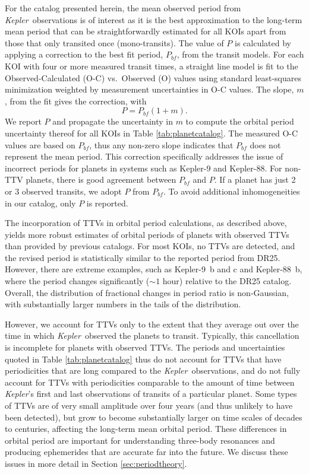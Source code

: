 \documentclass{aastex62}
\newcommand{\ikt}{{\it Kepler}}
\newcommand{\ik}{{\it Kepler~}}
\begin{document}
For the catalog presented herein, the mean observed period from \ik observations is of interest as it is the best approximation to the long-term mean period that can be straightforwardly estimated for all KOIs apart from those that only transited once (mono-transits). The value of $P$ is calculated by applying a correction to the best fit period, $P_{bf}$, from the transit models. For each KOI with four or more measured transit times, a straight line model is fit to the Observed-Calculated (O-C) vs.~Observed (O) values using standard least-squares minimization weighted by measurement uncertainties in O-C values.  The slope, $m$, from the fit gives the correction, with
\begin{equation}
P = P_{bf} (1 + m).
\end{equation}
We report $P$ and propagate the uncertainty in $m$ to compute the orbital period uncertainty thereof for all KOIs in Table \ref{tab:planetcatalog}.  The measured O-C values are based on $P_{bf}$, thus any non-zero slope indicates that $P_{bf}$ does not represent the mean period.  This correction specifically addresses the issue of incorrect periods for planets in systems such as Kepler-9 and Kepler-88.  For non-TTV planets, there is good agreement between $P_{bf}$ and $P$.  {If a planet has just 2 or 3 observed transits, we adopt $P$ from $P_{bf}$.}  To avoid additional inhomogeneities in our catalog, only $P$ is reported.

The incorporation of TTVs in orbital period calculations, as described above, yields {more robust estimates of orbital periods of planets with observed TTVs than provided by previous catalogs.  For most KOIs, no  TTVs  are detected, and the revised period is statistically similar to the reported period from DR25.  However, there are extreme examples, such as Kepler-9~b and c and Kepler-88~b, where the period changes significantly ($\sim 1$ hour) relative to the DR25 catalog.  Overall, the distribution of fractional changes in period ratio is non-Gaussian, with substantially larger numbers in the tails of the distribution. }  

However, we account for TTVs only to the extent that they average out over the time in which \ik observed the planets to transit.  Typically, this cancellation is incomplete for planets with observed TTVs. The periods and uncertainties quoted in Table \ref{tab:planetcatalog} thus do not account for TTVs that have periodicities that are long compared to the \ik observations, and do not fully account for TTVs with periodicities comparable to the amount of time between \ikt's first and last observations of transits of a particular planet. Some types of TTVs are of very small amplitude over four years (and thus unlikely to have been detected), but grow to become substantially larger on time scales of decades to centuries, affecting the long-term mean orbital period.  These differences in orbital period are important for understanding three-body resonances and producing ephemerides that are accurate far into the future.  We discuss these issues in more detail in Section \ref{sec:periodtheory}.
\end{document}

